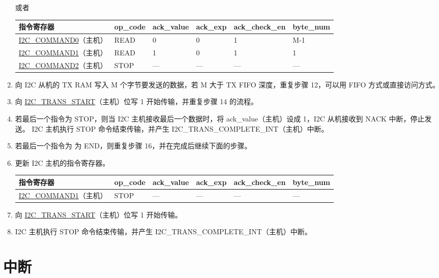 \documentclass[main\_\_CN.tex]{subfiles}
\begin{document}
\begin{enumerate}
或者

\begin{longtable}{ | p{4cm} | p{2cm} | p{2cm} | p{2cm} |p{2cm} | p{2cm} |}
\hline\rowcolor{lightgray}
指令寄存器& op\_code & ack\_value&ack\_exp&ack\_check\_en&byte\_num  \\ \hline
\hyperref[fielddesc:I2CCOMMAND0]{I2C\_COMMAND0}（主机）& READ& 0&0&1&M-1  \\ \hline
\hyperref[fielddesc:I2CCOMMAND1]{I2C\_COMMAND1}（主机）& READ& 1&0&1&1  \\ \hline
\hyperref[fielddesc:I2CCOMMAND2]{I2C\_COMMAND2}（主机）& STOP& ---&---&---&---  \\ \hline
\end{longtable}

\item 向 I2C 从机的 TX RAM 写入 M 个字节要发送的数据，若 M 大于 TX FIFO 深度，重复步骤 12，可以用 FIFO 方式或直接访问方式。
\item 向 \hyperref[fielddesc:I2CTRANSSTART]{I2C\_TRANS\_START}（主机）位写 1 开始传输，并重复步骤 14 的流程。
\item 若最后一个指令为 STOP，则当 I2C 主机接收最后一个数据时，将 ack\_value（主机）设成 1，I2C 从机接收到 NACK 中断，停止发送。 I2C 主机执行 STOP 命令结束传输，并产生 I2C\_TRANS\_COMPLETE\_INT（主机）中断。
\item 若最后一个指令为 为 END，则重复步骤 16，并在完成后继续下面的步骤。
\item 更新 I2C 主机的指令寄存器。
\begin{longtable}{ | p{4cm} | p{2cm} | p{2cm} | p{2cm} |p{2cm} | p{2cm} |}
\hline\rowcolor{lightgray}
指令寄存器& op\_code & ack\_value&ack\_exp&ack\_check\_en&byte\_num  \\ \hline
\hyperref[fielddesc:I2CCOMMAND1]{I2C\_COMMAND1}（主机）& STOP& ---&---&---&---  \\ \hline
\end{longtable}
\item 向 \hyperref[fielddesc:I2CTRANSSTART]{I2C\_TRANS\_START}（主机）位写 1 开始传输。
\item I2C 主机执行 STOP 命令结束传输，并产生 I2C\_TRANS\_COMPLETE\_INT（主机）中断。

\end{enumerate}

\section{中断}
\label{sub:i2c-int}
\end{document}
